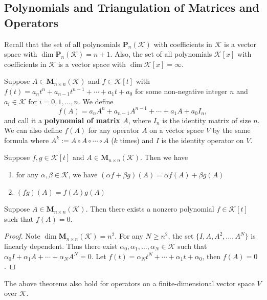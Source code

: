 \documentclass{ctexart}
\newcommand{\M}{\mathbf{M}}
\begin{document}
    \subsection{Polynomials and Triangulation of Matrices and Operators}
    Recall that the set of all polynomials $\mathbf P_n(\mathcal{K})$ with coefficients in $\mathcal{K}$ is a vector space with $\dim \mathbf P_n(\mathcal{K}) = n+1$. Also, the set of all polynomials $\mathcal{K}[x]$ with coefficients in $\mathcal{K}$ is a vector space with $\dim \mathcal K[x] = \infty$. 
    \begin{mydef}
        Suppose $A\in \M_{n\times n}(\mathcal{K})$ and $f\in \mathcal{K}[t]$ with $f(t) = a_n t^n + a_{n-1} t^{n-1} + \cdots + a_1 t + a_0$ for some non-negative integer $n$ and $a_i \in \mathcal K$ for $i=0,1,\ldots,n$. We define
        $$ f(A) = a_n A^n + a_{n-1} A^{n-1} + \cdots + a_1 A + a_0 I_n, $$
        and call it a \textbf{polynomial of matrix $A$}, where $I_n$ is the identity matrix of size $n$. We can also define $f(A)$ for any operator $A$ on a vector space $V$ by the same formula where $A^k := A \circ A \circ \cdots \circ A$ ($k$ times) and $I$ is the identity operator on $V$.
    \end{mydef}
    \begin{mythm}
        Suppose $f,g\in \mathcal K[t]$ and $A\in \M_{n\times n}(\mathcal{K})$. Then we have
        \begin{enumerate}[label=(\arabic*)]
            \item for any $\alpha, \beta \in \mathcal K$, we have $(\alpha f + \beta g)(A) = \alpha f(A) + \beta g(A)$
            \item $(fg)(A) = f(A) g(A)$
        \end{enumerate}
    \end{mythm}
    \begin{mythm}
        Suppose $A\in \M_{n\times n}(\mathcal{K})$. Then there exists a nonzero polynomial $f\in \mathcal{K}[t]$ such that $f(A) = 0$. 
    \end{mythm}
    \begin{proof}
        Note $\dim \M_{n\times n}(\mathcal{K}) = n^2$. For any $N \ge n^2$, the set $\{ I, A, A^2, \ldots, A^N \}$ is linearly dependent. Thus there exist $\alpha_0, \alpha_1, \ldots, \alpha_N \in \mathcal K$ such that $\alpha_0 I + \alpha_1 A + \cdots + \alpha_N A^N = 0$. Let $f(t) = \alpha_N t^N + \cdots + \alpha_1 t + \alpha_0$, then $f(A) = 0$.
    \end{proof}
    \begin{myrmk}
        The above theorems also hold for operators on a finite-dimensional vector space $V$ over $\mathcal K$.
    \end{myrmk}
\end{document}
